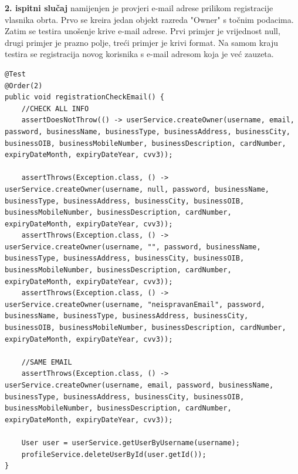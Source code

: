         \textbf{2. ispitni slučaj}{ namijenjen je provjeri e-mail adrese prilikom registracije vlasnika obrta. Prvo se kreira jedan objekt razreda "Owner" s točnim podacima. Zatim se testira unošenje krive e-mail adrese. Prvi primjer je vrijednost null, drugi primjer je prazno polje, treći primjer je krivi format. Na samom kraju testira se registracija novog korisnika s e-mail adresom koja je već zauzeta.}
           \begin{lstlisting}
@Test
@Order(2)
public void registrationCheckEmail() {
    //CHECK ALL INFO
    assertDoesNotThrow(() -> userService.createOwner(username, email, password, businessName, businessType, businessAddress, businessCity, businessOIB, businessMobileNumber, businessDescription, cardNumber, expiryDateMonth, expiryDateYear, cvv3));

    assertThrows(Exception.class, () -> userService.createOwner(username, null, password, businessName, businessType, businessAddress, businessCity, businessOIB, businessMobileNumber, businessDescription, cardNumber, expiryDateMonth, expiryDateYear, cvv3));
    assertThrows(Exception.class, () -> userService.createOwner(username, "", password, businessName, businessType, businessAddress, businessCity, businessOIB, businessMobileNumber, businessDescription, cardNumber, expiryDateMonth, expiryDateYear, cvv3));
    assertThrows(Exception.class, () -> userService.createOwner(username, "neispravanEmail", password, businessName, businessType, businessAddress, businessCity, businessOIB, businessMobileNumber, businessDescription, cardNumber, expiryDateMonth, expiryDateYear, cvv3));

    //SAME EMAIL
    assertThrows(Exception.class, () -> userService.createOwner(username, email, password, businessName, businessType, businessAddress, businessCity, businessOIB, businessMobileNumber, businessDescription, cardNumber, expiryDateMonth, expiryDateYear, cvv3));

    User user = userService.getUserByUsername(username);
    profileService.deleteUserById(user.getId());
}
        \end{lstlisting}

